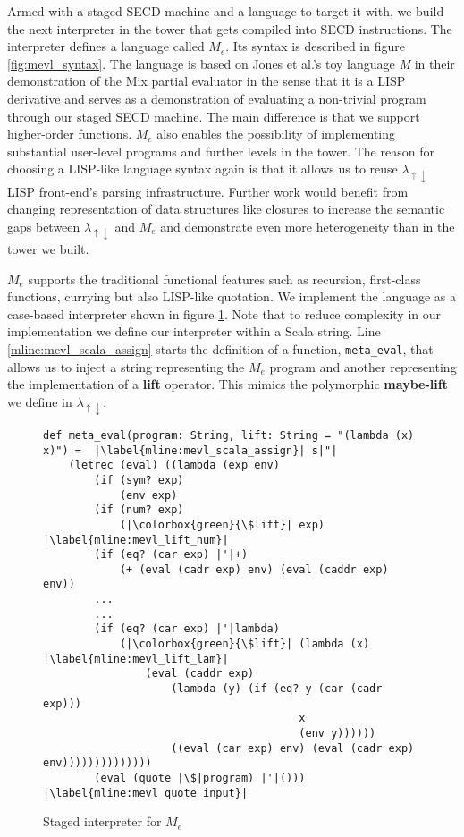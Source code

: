 \documentclass[a4paper,12pt,twoside,openright]{report}
\theoremstyle{definition}
\newcommand{\mslang}{$\lambda_{\uparrow\downarrow}$}
\newcommand{\mevl}{$M_{e}$}
\begin{document}
Armed with a staged SECD machine and a language to target it with, we build the next interpreter in the tower that gets compiled into SECD instructions. The interpreter defines a language called \mevl{}. Its syntax is described in figure \ref{fig:mevl_syntax}. The language is based on Jones et al.'s toy language \textit{M} in their demonstration of the Mix partial evaluator \cite{jones1989mix} in the sense that it is a LISP derivative and serves as a demonstration of evaluating a non-trivial program through our staged SECD machine. The main difference is that we support higher-order functions. \mevl{} also enables the possibility of implementing substantial user-level programs and further levels in the tower. The reason for choosing a LISP-like language syntax again is that it allows us to reuse \mslang{} LISP front-end's parsing infrastructure. Further work would benefit from changing representation of data structures like closures to increase the semantic gaps between \mslang{} and \mevl{} and demonstrate even more heterogeneity than in the tower we built.

\mevl{} supports the traditional functional features such as recursion, first-class functions, currying but also LISP-like quotation. We implement the language as a case-based interpreter shown in figure \ref{lst:mevl}. Note that to reduce complexity in our implementation we define our interpreter within a Scala string. Line \ref{mline:mevl_scala_assign} starts the definition of a function, \texttt{meta\_eval}, that allows us to inject a string representing the \mevl{} program and another representing the implementation of a \textbf{lift} operator. This mimics the polymorphic \textbf{maybe-lift} we define in \mslang.

\begin{figure}[htp!]
\centering
\begin{verbatim}
def meta_eval(program: String, lift: String = "(lambda (x) x)") =  |\label{mline:mevl_scala_assign}| s|"|
    (letrec (eval) ((lambda (exp env)
        (if (sym? exp)
            (env exp)
        (if (num? exp)
            (|\colorbox{green}{\$lift}| exp) |\label{mline:mevl_lift_num}|
        (if (eq? (car exp) |'|+)
            (+ (eval (cadr exp) env) (eval (caddr exp) env))
        ...
        ...
        (if (eq? (car exp) |'|lambda)
            (|\colorbox{green}{\$lift}| (lambda (x) |\label{mline:mevl_lift_lam}|
                (eval (caddr exp)
                    (lambda (y) (if (eq? y (car (cadr exp)))
                                        x
                                        (env y))))))
                    ((eval (car exp) env) (eval (cadr exp) env))))))))))))))
        (eval (quote |\$|program) |'|())) |\label{mline:mevl_quote_input}|
\end{verbatim}
\caption{Staged interpreter for \mevl}
\label{lst:mevl}
\end{figure}
\end{document}
